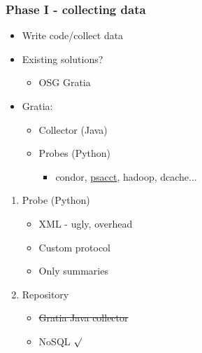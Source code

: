 \documentclass{beamer}
\begin{document}
\begin{frame}[t]
\frametitle{Phase I - collecting data}
\begin{itemize}
\item Write code/collect data
\item Existing solutions?
\begin{itemize}
	\item OSG Gratia
\end{itemize}
 \item Gratia:
\begin{itemize}
	\item Collector (Java)
	\item Probes (Python)
\begin{itemize}
		\item condor, \underline{psacct}, hadoop, dcache...
\end{itemize}
\end{itemize}
\end{itemize}
\begin{enumerate}
\item Probe (Python)
\begin{itemize}
	\item XML - ugly, overhead
	\item Custom protocol
	\item Only summaries
\end{itemize}
 \item Repository
\begin{itemize}
	\item \sout{Gratia Java collector}
	\item NoSQL $\surd$
\end{itemize}
\end{enumerate}
\end{frame}
\end{document}

